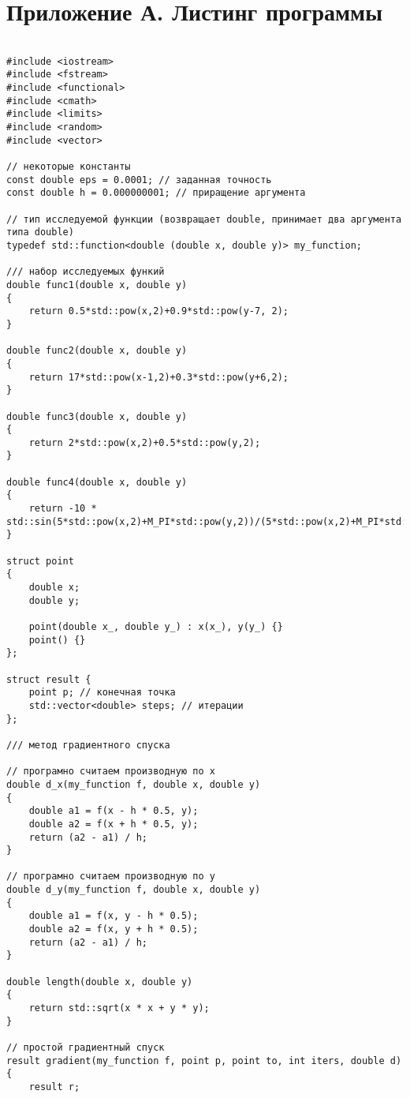 \documentclass[14pt]{matmex-diploma-custom}
\begin{document}
\section*{Приложение А. Листинг программы}

\setmonofont[Mapping=tex-text]{CMU Typewriter Text}

\begin{verbatim}

#include <iostream>
#include <fstream>
#include <functional>
#include <cmath>
#include <limits>
#include <random>
#include <vector>

// некоторые константы
const double eps = 0.0001; // заданная точность
const double h = 0.000000001; // приращение аргумента

// тип исследуемой функции (возвращает double, принимает два аргумента типа double)
typedef std::function<double (double x, double y)> my_function;

/// набор исследуемых функий
double func1(double x, double y)
{
    return 0.5*std::pow(x,2)+0.9*std::pow(y-7, 2);
}

double func2(double x, double y)
{
    return 17*std::pow(x-1,2)+0.3*std::pow(y+6,2);
}

double func3(double x, double y)
{
    return 2*std::pow(x,2)+0.5*std::pow(y,2);
}

double func4(double x, double y)
{
    return -10 * std::sin(5*std::pow(x,2)+M_PI*std::pow(y,2))/(5*std::pow(x,2)+M_PI*std::pow(y,2));
}

struct point
{
    double x;
    double y;

    point(double x_, double y_) : x(x_), y(y_) {}
    point() {}
};

struct result {
    point p; // конечная точка
    std::vector<double> steps; // итерации
};

/// метод градиентного спуска

// програмно считаем производную по x
double d_x(my_function f, double x, double y)
{
    double a1 = f(x - h * 0.5, y);
    double a2 = f(x + h * 0.5, y);
    return (a2 - a1) / h;
}

// програмно считаем производную по y
double d_y(my_function f, double x, double y)
{
    double a1 = f(x, y - h * 0.5);
    double a2 = f(x, y + h * 0.5);
    return (a2 - a1) / h;
}

double length(double x, double y)
{
    return std::sqrt(x * x + y * y);
}

// простой градиентный спуск
result gradient(my_function f, point p, point to, int iters, double d)
{
    result r;


\end{verbatim}
\end{document}
